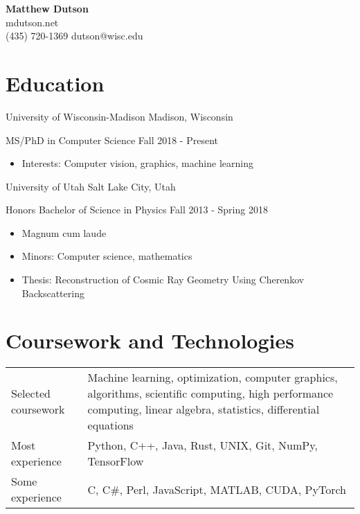 



\setfont
\pagestyle{empty}

\begin{center}
    {\LARGE \bfseries Matthew Dutson}\\
    \medskip
    mdutson.net\\
    (435) 720-1369 \enspace dutson@wisc.edu
\end{center}

\section*{Education}

\begin{tab1} University of Wisconsin-Madison \> Madison, Wisconsin \end{tab1}

\begin{tab2} MS/PhD in Computer Science \> Fall 2018 - Present \end{tab2}
\begin{itemize}
    \item Interests: Computer vision, graphics, machine learning
\end{itemize}

\blockskip

\begin{tab1} University of Utah \> Salt Lake City, Utah \end{tab1}

\begin{tab2} Honors Bachelor of Science in Physics \> Fall 2013 - Spring 2018 \end{tab2}
\begin{itemize}
    \item Magnum cum laude
    \item Minors: Computer science, mathematics
    \item Thesis: Reconstruction of Cosmic Ray Geometry Using Cherenkov Backscattering
\end{itemize}

\section*{Coursework and Technologies}

\begin{tabular}{ @{} p{1.75in} p{5in} }
Selected coursework & Machine learning, optimization, computer graphics, algorithms, scientific computing, high performance computing, linear algebra, statistics, differential equations \\
Most experience & Python, C++, Java, Rust, UNIX, Git, NumPy, TensorFlow \\
Some experience & C, C\#, Perl, JavaScript, MATLAB, CUDA, PyTorch
\end{tabular}

